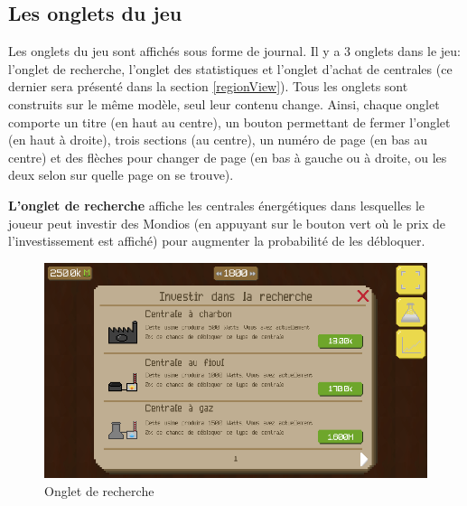 \documentclass{article}
\begin{document}
		\subsection{Les onglets du jeu} \label{onglets}
		Les onglets du jeu sont affichés sous forme de journal.
		Il y a 3 onglets dans le jeu: l'onglet de recherche, l'onglet des statistiques et l'onglet d'achat de centrales (ce dernier sera présenté dans la section \ref{regionView}).
		Tous les onglets sont construits sur le même modèle, seul leur contenu change. Ainsi, chaque onglet comporte un titre (en haut au centre), un bouton permettant de fermer l'onglet (en haut à droite), trois sections (au centre), un numéro de page (en bas au centre) et des flèches pour changer de page (en bas à gauche ou à droite, ou les deux selon sur quelle page on se trouve).
		
		
		\textbf{L'onglet de recherche} affiche les centrales énergétiques dans lesquelles le joueur peut investir des Mondios (en appuyant sur le bouton vert où le prix de l'investissement est affiché) pour augmenter la probabilité de les débloquer.
		
		\begin{figure}[H]
                \includegraphics[width=\linewidth]{../images/recherche}
                \caption{Onglet de recherche}
                \label{fig:research}
        \end{figure}
        
\end{document}
